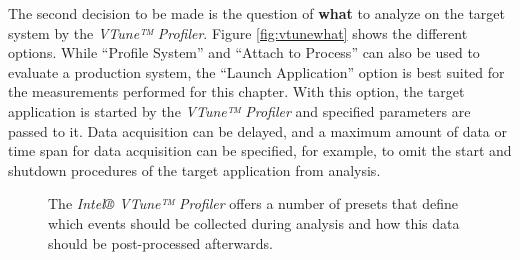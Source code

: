     The second decision to be made is the question of \textbf{what} to analyze on the target system by the \textit{VTune™ Profiler}. Figure \ref{fig:vtunewhat} shows the different options. While ``Profile System'' and ``Attach to Process'' can also be used to evaluate a production system, the ``Launch Application'' option is best suited for the measurements performed for this chapter. With this option, the target application is started by the \textit{VTune™ Profiler} and specified parameters are passed to it. Data acquisition can be delayed, and a maximum amount of data or time span for data acquisition can be specified, for example, to omit the start and shutdown procedures of the target application from analysis.

\begin{@empty}
    \setlength{\fboxsep}{0pt}%
    \setlength{\fboxrule}{1pt}%
    
    \begin{figure}[h]
        \centering
        \vspace{.75em}
        \caption[How should the VTune™ Profiler analyze the target?]{The \textit{Intel® VTune™ Profiler} offers a number of presets that define which events should be collected during analysis and how this data should be post-processed afterwards.}
        \label{fig:vtunehow}
    \end{figure}
\end{@empty}

